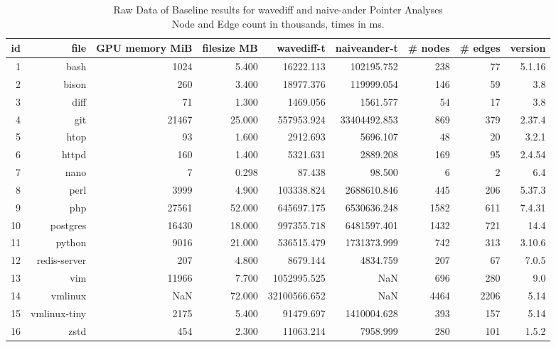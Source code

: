 \begin{table}[ht]
    \tiny
    \begin{tabular}{rrrrrrrrr}
        \toprule
        id & file         & GPU memory MiB & filesize MB & wavediff-t   & naiveander-t & \# nodes & \# edges & version \\
        \midrule
        1  & bash         & 1024           & 5.400       & 16222.113    & 102195.752   & 238      & 77       & 5.1.16  \\
        2  & bison        & 260            & 3.400       & 18977.376    & 119999.054   & 146      & 59       & 3.8     \\
        3  & diff         & 71             & 1.300       & 1469.056     & 1561.577     & 54       & 17       & 3.8     \\
        4  & git          & 21467          & 25.000      & 557953.924   & 33404492.853 & 869      & 379      & 2.37.4  \\
        5  & htop         & 93             & 1.600       & 2912.693     & 5696.107     & 48       & 20       & 3.2.1   \\
        6  & httpd        & 160            & 1.400       & 5321.631     & 2889.208     & 169      & 95       & 2.4.54  \\
        7  & nano         & 7              & 0.298       & 87.438       & 98.500       & 6        & 2        & 6.4     \\
        8  & perl         & 3999           & 4.900       & 103338.824   & 2688610.846  & 445      & 206      & 5.37.3  \\
        9  & php          & 27561          & 52.000      & 645697.175   & 6530636.248  & 1582     & 611      & 7.4.31  \\
        10 & postgres     & 16430          & 18.000      & 997355.718   & 6481597.401  & 1432     & 721      & 14.4    \\
        11 & python       & 9016           & 21.000      & 536515.479   & 1731373.999  & 742      & 313      & 3.10.6  \\
        12 & redis-server & 207            & 4.800       & 8679.144     & 4834.759     & 207      & 67       & 7.0.5   \\
        13 & vim          & 11966          & 7.700       & 1052995.525  & NaN          & 696      & 280      & 9.0     \\
        14 & vmlinux      & NaN            & 72.000      & 32100566.652 & NaN          & 4464     & 2206     & 5.14    \\
        15 & vmlinux-tiny & 2175           & 5.400       & 91479.697    & 1410004.628  & 393      & 157      & 5.14    \\
        16 & zstd         & 454            & 2.300       & 11063.214    & 7958.999     & 280      & 101      & 1.5.2   \\
        \bottomrule
    \end{tabular}

    \caption[Raw Data of Baseline results for wavediff and naive-ander Pointer Analyses]{Raw Data of Baseline results for wavediff and naive-ander Pointer Analyses\\Node and Edge count in thousands, times in ms.}
\end{table}

